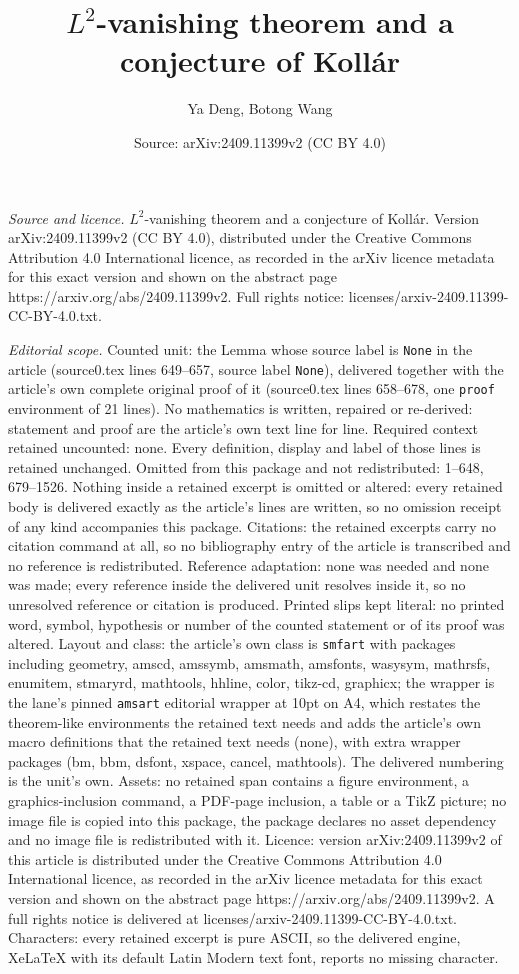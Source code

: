\documentclass[10pt,a4paper]{amsart}
\title[$L^2$-vanishing theorem and a conjecture of Koll\'ar]{$L^2$-vanishing theorem and a conjecture of Koll\'ar}
\author{Ya Deng, Botong Wang}
\date{Source: arXiv:2409.11399v2 (CC BY 4.0)}
\begin{document}
\maketitle

\noindent\emph{Source and licence.} $L^2$-vanishing theorem and a conjecture of Koll\'ar. Version arXiv:2409.11399v2 (CC BY 4.0), distributed under the Creative Commons Attribution 4.0 International licence, as recorded in the arXiv licence metadata for this exact version and shown on the abstract page https://arxiv.org/abs/2409.11399v2. Full rights notice: licenses/arxiv-2409.11399-CC-BY-4.0.txt.\par\smallskip

\noindent\textit{Editorial scope.} Counted unit: the Lemma whose source label is \texttt{None} in the article (source0.tex lines 649--657, source label \texttt{None}), delivered together with the article's own complete original proof of it (source0.tex lines 658--678, one \texttt{proof} environment of 21 lines). No mathematics is written, repaired or re-derived: statement and proof are the article's own text line for line. Required context retained uncounted: none. Every definition, display and label of those lines is retained unchanged. Omitted from this package and not redistributed: 1--648, 679--1526. Nothing inside a retained excerpt is omitted or altered: every retained body is delivered exactly as the article's lines are written, so no omission receipt of any kind accompanies this package. Citations: the retained excerpts carry no citation command at all, so no bibliography entry of the article is transcribed and no reference is redistributed. Reference adaptation: none was needed and none was made; every reference inside the delivered unit resolves inside it, so no unresolved reference or citation is produced. Printed slips kept literal: no printed word, symbol, hypothesis or number of the counted statement or of its proof was altered. Layout and class: the article's own class is \texttt{smfart} with packages including geometry, amscd, amssymb, amsmath, amsfonts, wasysym, mathrsfs, enumitem, stmaryrd, mathtools, hhline, color, tikz-cd, graphicx; the wrapper is the lane's pinned \texttt{amsart} editorial wrapper at 10pt on A4, which restates the theorem-like environments the retained text needs and adds the article's own macro definitions that the retained text needs (none), with extra wrapper packages (bm, bbm, dsfont, xspace, cancel, mathtools). The delivered numbering is the unit's own. Assets: no retained span contains a figure environment, a graphics-inclusion command, a PDF-page inclusion, a table or a TikZ picture; no image file is copied into this package, the package declares no asset dependency and no image file is redistributed with it. Licence: version arXiv:2409.11399v2 of this article is distributed under the Creative Commons Attribution 4.0 International licence, as recorded in the arXiv licence metadata for this exact version and shown on the abstract page https://arxiv.org/abs/2409.11399v2. A full rights notice is delivered at licenses/arxiv-2409.11399-CC-BY-4.0.txt. Characters: every retained excerpt is pure ASCII, so the delivered engine, XeLaTeX with its default Latin Modern text font, reports no missing character.
\end{document}
